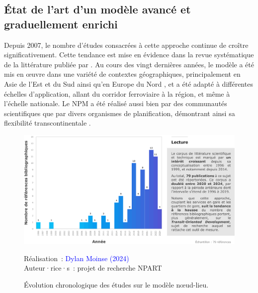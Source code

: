 \begin{refsegment}
\subsection{État de l'art d'un modèle avancé et graduellement enrichi
    \label{chap6:litterature-etat-art}
    }

Depuis 2007, le nombre d'études consacrées à cette approche continue de croître significativement. Cette tendance est mise en évidence dans la revue systématique de la littérature publiée par \textcolor{blue}{\textcite[383]{ibrahim_planning_2022}}. Au cours des vingt dernières années, le modèle a été mis en œuvre dans une variété de contextes géographiques, principalement en Asie de l'Est et du Sud ainsi qu'en Europe du Nord \textcolor{blue}{\autocite[1]{caset_integrating_2020}}, et a été adapté à différentes échelles d'application, allant du corridor ferroviaire à la région, et même à l'échelle nationale. Le \acrshort{NPM} a été réalisé aussi bien par des communautés scientifiques que par divers organismes de planification, démontrant ainsi sa flexibilité transcontinentale \textcolor{blue}{\autocite[1]{caset_integrating_2020}}.%

    \begin{figure}[h!]\vspace*{4pt}
        \caption{Évolution chronologique des études sur le modèle nœud-lieu.}
        \label{fig-chap6:litterature-chronologie}
        \centerline{\includegraphics[width=1\columnwidth]{src/Figures/Chap-6/FR_NPART_Chronologie.pdf}}
        \vspace{5pt}
        \begin{flushright}\scriptsize{
        Réalisation~: \textcolor{blue}{Dylan Moinse (2024)}
        \\
        Auteur·rice·s~: projet de recherche \acrshort{NPART}
        }\end{flushright}
    \end{figure}


\end{refsegment}
